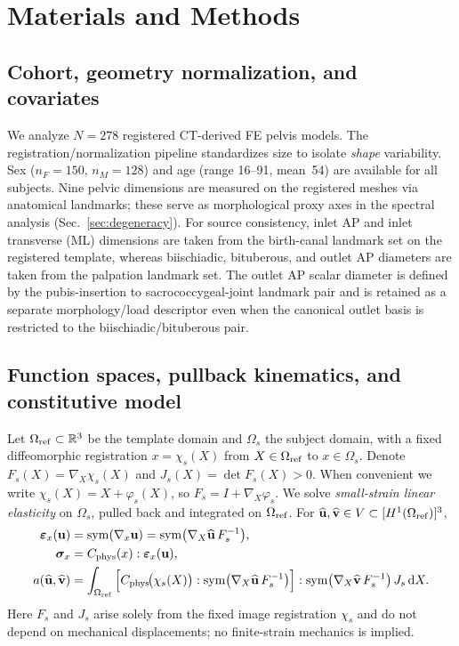 \documentclass[11pt]{article}
\begin{document}
\section{Materials and Methods}

\subsection{Cohort, geometry normalization, and covariates}
We analyze $N=278$ registered CT-derived FE pelvis models.
The registration/normalization pipeline standardizes size to isolate \emph{shape} variability.
Sex ($n_F{=}150$, $n_M{=}128$) and age (range 16--91, mean~54) are available for all subjects.
Nine pelvic dimensions are measured on the registered meshes via anatomical landmarks; these serve as morphological proxy axes in the spectral analysis (Sec.~\ref{sec:degeneracy}).
For source consistency, inlet AP and inlet transverse (ML) dimensions are taken from the birth-canal landmark set on the registered template, whereas biischiadic, bituberous, and outlet AP diameters are taken from the palpation landmark set.
The outlet AP scalar diameter is defined by the pubis-insertion to sacrococcygeal-joint landmark pair and is retained as a separate morphology/load descriptor even when the canonical outlet basis is restricted to the biischiadic/bituberous pair.

\subsection{Function spaces, pullback kinematics, and constitutive model}
\label{sec:pullback}
Let $\Omega_{\rm ref}\subset\mathbb{R}^3$ be the template domain and $\Omega_s$ the subject domain, with a fixed diffeomorphic registration $x=\chi_s(X)$ from $X\in\Omega_{\rm ref}$ to $x\in\Omega_s$. Denote $F_s(X)=\nabla_X \chi_s(X)$ and $J_s(X)=\det F_s(X)>0$. When convenient we write $\chi_s(X)=X+\varphi_s(X)$, so $F_s=I+\nabla_X\varphi_s$. We solve \emph{small-strain linear elasticity} on $\Omega_s$, pulled back and integrated on $\Omega_{\rm ref}$. For $\widehat{\mathbf u},\widehat{\mathbf v}\in V\subset[H^1(\Omega_{\rm ref})]^3$,
\begin{align}
\bm\varepsilon_x(\mathbf u)&=\mathrm{sym}(\nabla_x \mathbf u)=\mathrm{sym}\big(\nabla_X \widehat{\mathbf u}\,F_s^{-1}\big),\\
\bm\sigma_x&=C_{\rm phys}(x):\bm\varepsilon_x(\mathbf u),\\
a(\widehat{\mathbf u},\widehat{\mathbf v})
&=\int_{\Omega_{\rm ref}}\Big[C_{\rm phys}\!\big(\chi_s(X)\big):\mathrm{sym}\big(\nabla_X \widehat{\mathbf u}\,F_s^{-1}\big)\Big]:
\mathrm{sym}\big(\nabla_X \widehat{\mathbf v}\,F_s^{-1}\big)\,J_s\,\mathrm dX.
\end{align}
Here $F_s$ and $J_s$ arise solely from the fixed image registration $\chi_s$ and do not depend on mechanical displacements; no finite-strain mechanics is implied.
\end{document}
